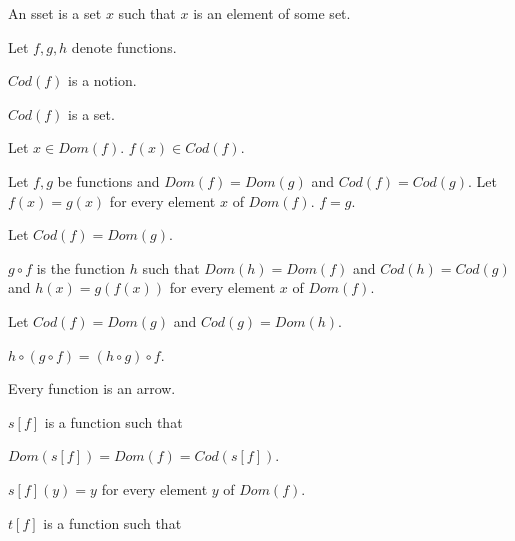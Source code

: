 \documentclass{article}
\begin{document}
	\begin{forthel}
		

		\begin{definition} 
			An sset is a set $x$ such that $x$ is an element of some set.
		\end{definition}
		
		Let $f,g,h$ denote functions.
		
		\begin{signature} 
			$Cod(f)$ is a notion. 
		\end{signature}

		\begin{axiom} 
			$Cod(f)$ is a set. 
		\end{axiom}
		
		\begin{axiom} 
			Let $x \in  Dom(f)$. $f(x) \in Cod(f)$.
		\end{axiom}

		\begin{axiom}[Ext]
			Let $f,g$ be functions and $Dom(f) = Dom(g)$ and $Cod(f) = Cod(g)$.
			Let $f(x) = g(x)$ for every element $x$ of $Dom(f)$.
			$f = g$.
		\end{axiom}
		
		\begin{definition} 
			Let $Cod(f)=Dom(g)$. 
			
			$g \circ f$ is the function $h$ such that
			$Dom(h)=Dom(f)$ and $Cod(h)=Cod(g)$ and $h(x)=g(f(x))$ for every element $x$ of $Dom(f)$.
		\end{definition}
		
		\begin{axiom} 
			Let $Cod(f)=Dom(g)$ and $Cod(g)=Dom(h)$.
			
			$h \circ (g \circ f) = (h \circ g) \circ f$.
		\end{axiom}
		
		\begin{axiom}
			Every function is an arrow.
		\end{axiom}
		
		\begin{axiom}		
			$s[f]$ is a function such that 
			
			$Dom(s[f])=Dom(f)=Cod(s[f])$.
		\end{axiom}
		
		\begin{axiom} 
			$s[f](y)=y$ for every element $y$ of $Dom(f)$.
		\end{axiom}
		

		\begin{axiom}		
			$t[f]$ is a function such that 
			

\end{axiom}
\end{forthel}
\end{document}
